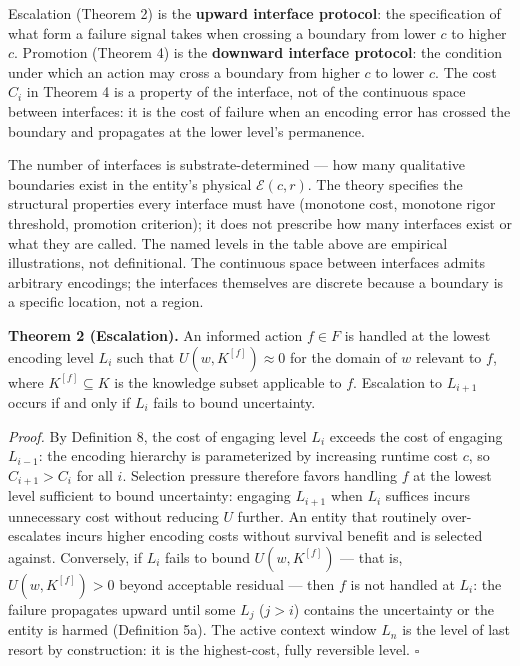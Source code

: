 \documentclass[
]{article}
\begin{document}
Escalation (Theorem 2) is the \textbf{upward interface protocol}: the
specification of what form a failure signal takes when crossing a
boundary from lower \(c\) to higher \(c\). Promotion (Theorem 4) is the
\textbf{downward interface protocol}: the condition under which an
action may cross a boundary from higher \(c\) to lower \(c\). The cost
\(C_i\) in Theorem 4 is a property of the interface, not of the
continuous space between interfaces: it is the cost of failure when an
encoding error has crossed the boundary and propagates at the lower
level's permanence.

The number of interfaces is substrate-determined --- how many
qualitative boundaries exist in the entity's physical
\(\mathcal{E}(c, r)\). The theory specifies the structural properties
every interface must have (monotone cost, monotone rigor threshold,
promotion criterion); it does not prescribe how many interfaces exist or
what they are called. The named levels in the table above are empirical
illustrations, not definitional. The continuous space between interfaces
admits arbitrary encodings; the interfaces themselves are discrete
because a boundary is a specific location, not a region.

\textbf{Theorem 2 (Escalation).} An informed action \(f \in F\) is
handled at the lowest encoding level \(L_i\) such that
\(U(w, K^{[f]}) \approx 0\) for the domain of \(w\) relevant to \(f\),
where \(K^{[f]} \subseteq K\) is the knowledge subset applicable to
\(f\). Escalation to \(L_{i+1}\) occurs if and only if \(L_i\) fails to
bound uncertainty.

\emph{Proof.} By Definition 8, the cost of engaging level \(L_i\)
exceeds the cost of engaging \(L_{i-1}\): the encoding hierarchy is
parameterized by increasing runtime cost \(c\), so \(C_{i+1} > C_i\) for
all \(i\). Selection pressure therefore favors handling \(f\) at the
lowest level sufficient to bound uncertainty: engaging \(L_{i+1}\) when
\(L_i\) suffices incurs unnecessary cost without reducing \(U\) further.
An entity that routinely over-escalates incurs higher encoding costs
without survival benefit and is selected against. Conversely, if \(L_i\)
fails to bound \(U(w, K^{[f]})\) --- that is, \(U(w, K^{[f]}) > 0\)
beyond acceptable residual --- then \(f\) is not handled at \(L_i\): the
failure propagates upward until some \(L_j\) (\(j > i\)) contains the
uncertainty or the entity is harmed (Definition 5a). The active context
window \(L_n\) is the level of last resort by construction: it is the
highest-cost, fully reversible level. \(\square\)
\end{document}
